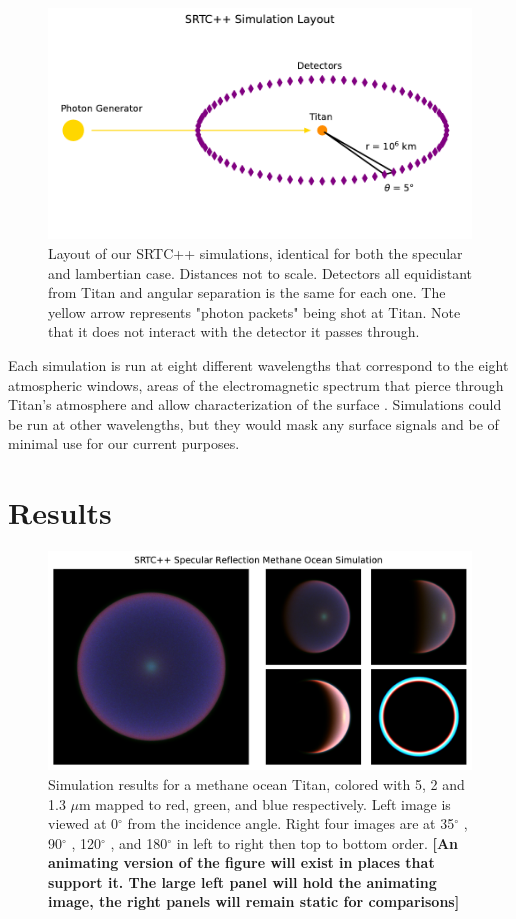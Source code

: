\documentclass[twocolumn,linenumbers]{aastex631}
\begin{document}
\begin{figure}[htbp]
\includegraphics[scale = 0.5]{SRTCLayout.pdf}
\centering
\caption{Layout of our SRTC++ simulations, identical for both the specular and lambertian case. Distances not to scale. Detectors all equidistant from Titan and angular separation is the same for each one. The yellow arrow represents "photon packets" being shot at Titan. Note that it does not interact with the detector it passes through.}
\label{fig:5}
\end{figure}

Each simulation is run at eight different wavelengths that correspond to the eight atmospheric windows, areas of the electromagnetic spectrum that pierce through Titan's atmosphere and allow characterization of the surface \citep{Barnes2007}. Simulations could be run at other wavelengths, but they would mask any surface signals and be of minimal use for our current purposes. 

\section{Results} \label{sec:results}

\begin{figure}[htbp]
\includegraphics[scale = 0.4]{SpecularSim.pdf}
\centering
\caption{Simulation results for a methane ocean Titan, colored with 5, 2 and 1.3 $\mu$m mapped to red, green, and blue respectively. Left image is viewed at 0$^{\circ}$  from the incidence angle. Right four images are at  35$^{\circ}$ ,  90$^{\circ}$ ,  120$^{\circ}$ , and  180$^{\circ}$  in left to right then top to bottom order. \textbf{\color{red} [An animating version of the figure will exist in places that support it. The large left panel will hold the animating image, the right panels will remain static for comparisons] \color{black}}}
\label{fig:6}
\end{figure}
\end{document}

